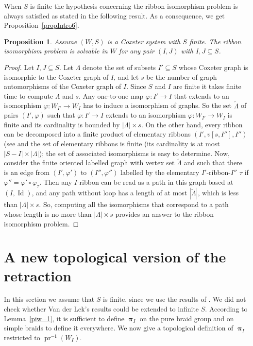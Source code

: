 \documentclass{amsart}
\numberwithin{equation}{section}
\newtheorem{proposition}[equation]{Proposition}
\newcommand\inv{^{-1}}
\DeclareMathOperator\Id{Id}
\DeclareMathOperator\pr{pr}
\DeclareMathOperator\bpi{\boldsymbol\pi}
\begin{document}
When $S$ is finite the  hypothesis concerning  the ribbon isomorphism problem  is always satisfied as stated in  the following result.  As a consequence, we get Proposition~\ref{propIntro6}.

\begin{proposition}\label{determiner aut ruban}  Assume $(W,S)$ is a Coxeter system with $S$ finite.  The ribbon isomorphism problem is solvable  in $W$ for any pair $(I,J)$ with $I,J\subseteq S$.  
\end{proposition}
\begin{proof} Let $I,J\subseteq S$. 
Let $\Lambda$ denote the set of subsets $I'\subseteq S$ whose Coxeter graph is
isomorphic to the Coxeter graph of $I$, and
let $s$ be the number of graph automorphisms of the Coxeter graph of $I$. 
Since $S$ and $I$ are finite it takes finite time to compute $\Lambda$ and $s$.
Any one-to-one map $\varphi : I'\to I$ that extends to an
isomorphism $\varphi : W_{I'} \to W_I$ has to induce a isomorphism of graphs.
So the set $\tilde{\Lambda}$ of pairs $(I',\varphi)$ such that $\varphi :
I'\to I$ extends to an isomorphism $\varphi : W_{I'} \to W_I$ is finite and
its cardinality is bounded by $|\Lambda|\times s$. 
On the other hand, every ribbon can be decomposed into a finite product of
elementary ribbons $(I',v[s,I''],I'')$  (see \cite[Proposition~2.3]{Brink-Howlett} and the set of
elementary ribbons is finite (its cardinality is at most $|S-I|\times
|\Lambda|$); the set of associated isomorphisms is easy to determine. 
Now, consider the finite oriented labelled graph with vertex set
$\tilde{\Lambda}$ and such that there is an edge from $(I',\varphi')$ to $(I'',\varphi'')$ labelled by the elementary
$I'$-ribbon-$I''$ $\tau$ if $\varphi''  = \varphi'\circ\varphi_\tau$.
Then  any $I$-ribbon  can be  read as  a path  in this  graph based at $(I,
\Id)$,   and  any  path  without  loop  has   a  length  of  at  most
$|\tilde{\Lambda}|$,  which  is  less  than  $|\Lambda|\times  s$. So,
computing  all the isomorphisms that correspond to  a path whose length is no
more  than $|\Lambda|\times s$ provides an answer to the ribbon isomorphism
problem.
\end{proof}

\section{A new topological version of the retraction}\label{section4}
In this section we assume that $S$ is finite, since we use the results of
\cite{VanderLek}. We did not check whether Van der Lek's results could be extended
to infinite $S$.
According  to Lemma~\ref{piw=1}, it is  sufficient to define $\bpi_I$ on the
pure  braid group and on simple braids to define it everywhere. We now give
a topological definition of $\bpi_I$ restricted to $\pr\inv(W_I)$.
\end{document}
